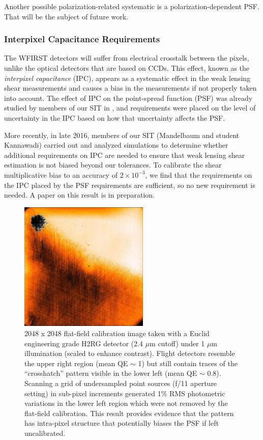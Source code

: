 Another possible polarization-related systematic is a polarization-dependent PSF.  That will be the
subject of future work.

\subsubsection{Interpixel Capacitance Requirements}

The WFIRST detectors will suffer from electrical crosstalk between the pixels, unlike the optical
 detectors that are based on CCDs. This effect, known as the \emph{interpixel capacitance} (IPC),
 appears as a systematic effect in the weak lensing shear measurements and causes a
 bias in the measurements if not properly taken into account. The effect of IPC on the point-spread
 function (PSF) was already studied by members of our SIT in \cite{Kannawadi2016}, and requirements were placed
 on the level of uncertainty in the IPC based on how that uncertainty affects the PSF.

More recently, in late 2016, members of our SIT (Mandelbaum and student Kannawadi) carried out and
analyzed simulations to determine whether additional requirements on IPC are needed to ensure that
weak lensing shear estimation is not biased beyond our tolerances.  To calibrate the shear
multiplicative bias to an accuracy of $2\times 10^{-3}$, we find that the requirements on the IPC
placed by the PSF requirements are sufficient, so no new requirement is needed.  A paper on this
result is in preparation.


\begin{figure}[!t]
  \includegraphics[width=0.55\textwidth]{Plots/Euclid_flat_crosshatch.jpg}
\caption{\label{fig:crosshatch}2048 x 2048 flat-field calibration image taken with a Euclid engineering grade H2RG detector (2.4 $\mu$m cutoff) under 1 $\mu$m illumination (scaled to enhance contrast).  Flight detectors resemble the upper right region (mean QE $\sim$ 1) but still contain traces of the ``crosshatch'' pattern visible in the lower left (mean QE $\sim$ 0.8).  Scanning a grid of undersampled point sources (f/11 aperture setting) in sub-pixel increments generated 1\% RMS photometric variations in the lower left region which were not removed by the flat-field calibration.  This result provides evidence that the pattern has intra-pixel structure that potentially biases the PSF if left uncalibrated.}
\end{figure}

